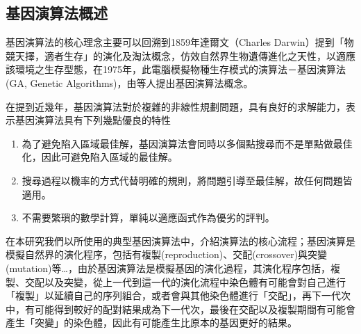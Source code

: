 \subsection{基因演算法概述}
\label{c:ch6.3.1}
基因演算法的核心理念主要可以回溯到1859年達爾文（Charles Darwin）提到「物競天擇，適者生存」的演化及淘汰概念，仿效自然界生物遺傳進化之天性，以適應該環境之生存型態，在1975年，此電腦模擬物種生存模式的演算法－基因演算法(GA, Genetic Algorithms)，由\cite{holland1975adaptation}等人提出基因演算法概念。

在提到近幾年，基因演算法對於複雜的非線性規劃問題，具有良好的求解能力，\cite{goldberg1988genetic}表示基因演算法具有下列幾點優良的特性
\begin{enumerate}[(1)]
	\item 為了避免陷入區域最佳解，基因演算法會同時以多個點搜尋而不是單點做最佳化，因此可避免陷入區域的最佳解。
	\item 搜尋過程以機率的方式代替明確的規則，將問題引導至最佳解，故任何問題皆適用。
	\item 不需要繁瑣的數學計算，單純以適應函式作為優劣的評判。
\end{enumerate}

在本研究我們以\cite{Wu.etc}所使用的典型基因演算法中，介紹演算法的核心流程；基因演算是模擬自然界的演化程序，包括有複製(reproduction)、交配(crossover)與突變(mutation)等\dots，由於基因演算法是模擬基因的演化過程，其演化程序包括，複製、交配以及突變，從上一代到這一代的演化流程中染色體有可能會對自己進行「複製」以延續自己的序列組合，或者會與其他染色體進行「交配」，再下一代次中，有可能得到較好的配對結果成為下一代次，最後在交配以及複製期間有可能會產生「突變」的染色體，因此有可能產生比原本的基因更好的結果。

